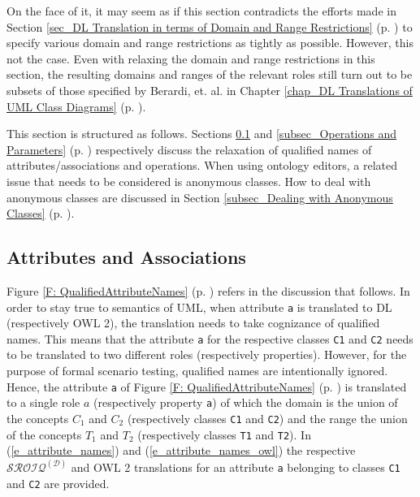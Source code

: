 On the face of it, it may seem as if this section contradicts the efforts made in Section
\ref{sec_DL Translation in terms of Domain and Range Restrictions} 
(p. \pageref{sec_DL Translation in terms of Domain and Range Restrictions}) to
specify various domain and range restrictions as tightly as possible. However,
this not the case. Even with relaxing the domain and range restrictions in this section,
the resulting domains and ranges of the relevant roles still turn out to be subsets of 
those specified by Berardi, et. al. \cite{Berardi2005} in Chapter 
\ref{chap_DL Translations of UML Class Diagrams} 
(p. \pageref{chap_DL Translations of UML Class Diagrams}).

This section is structured as follows.
Sections \ref{subsec_Attributes and Associations} and \ref{subsec_Operations and Parameters} 
(p. \pageref{subsec_Operations and Parameters}) 
respectively discuss the relaxation of qualified names of attributes/associations 
and operations. When using ontology editors, a related issue that needs to be considered is 
anonymous classes. How to deal with anonymous classes are discussed in 
Section \ref{subsec_Dealing with Anonymous Classes} (p. \pageref{subsec_Dealing with Anonymous Classes}).


\subsection{Attributes and Associations} \label{subsec_Attributes and Associations}
Figure \ref{F: QualifiedAttributeNames} (p. \pageref{F: QualifiedAttributeNames}) refers in the discussion that follows. In order to stay true to semantics of UML, 
when attribute \texttt{a} is translated to DL (respectively OWL 2), the translation needs to take cognizance of qualified names.
This means that the attribute \texttt{a} for the respective classes \texttt{C1} and \texttt{C2} needs to be translated to two different roles (respectively properties). 
However, for the purpose of formal scenario testing, qualified names are intentionally ignored. Hence, the attribute \texttt{a} of Figure \ref{F: QualifiedAttributeNames} (p. \pageref{F: QualifiedAttributeNames}) 
is translated to a single role $a$ (respectively property \texttt{a}) of which the domain is the union
of the concepts $C_1$ and $C_2$ (respectively classes \texttt{C1} and \texttt{C2}) and the range the union of the concepts $T_1$ and $T_2$ (respectively classes \texttt{T1} and \texttt{T2}).
In (\ref{e_attribute_names}) and (\ref{e_attribute_names_owl}) the respective $\mathcal{SROIQ}^{(\mathcal{D})}$ and OWL 2 translations for an attribute \texttt{a} belonging to classes
\texttt{C1} and \texttt{C2} are provided. 

